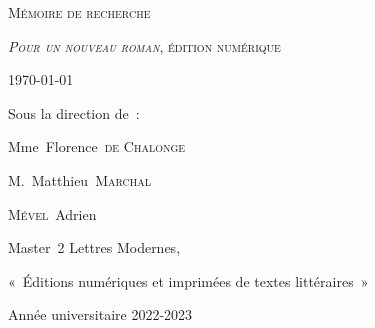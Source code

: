 \documentclass[12pt, a4paper]{article}
\begin{document}


\begin{titlepage}
  

\vspace*{3cm}

 
\begin{center}
\textsc{\huge Mémoire de recherche}

\textsc{\textit{Pour un nouveau roman}, édition numérique}



\today


\vspace*{2cm}
Sous la direction de~: 

Mme~Florence~\textsc{de Chalonge}


M.~Matthieu~\textsc{Marchal}




\vspace*{11cm}
\small
\textsc{Mével}~Adrien

Master~2 Lettres Modernes,

«~Éditions numériques et imprimées de textes littéraires~»

\vspace*{2.5cm}
Année universitaire 2022-2023




\end{center}


\end{titlepage}	

\newcommand{\qql}{\textsc{Sartre} Jean-Paul, \textit{Qu'est-ce que la littérature}, Paris, Gallimard, coll. «~folio essais~», 2008 [1948], p.~}
\newcommand{\punr}{\textit{Pour un nouveau roman}}
\newcommand{\robbe}{Alain~Robbe-Grillet}
\newcommand{\galia}{Galia~\textsc{Yanoshevsky}}
\newcommand{\op}{\textit{Op. cit.}, p.~}
\newcommand{\fullgalia}{\textsc{Yanoshevsky} Galia, \textit{Les discours du Nouveau Roman~: Essais, entretiens, débats}, Villeneuve d'Ascq, Presses universitaires du Septentrion, 2006, p.~}
\newcommand{\gege}{\textsc{Genette}~Gérard, «~Vertige fixé~», \textit{Figures I}, Paris, Éditions du seuil, coll.~«~points essai~», 2014[1966], p.~}
\newcommand{\inte}{\footnote{\textsc{Boschetti}~Anna, \textsc{Sapiro}~Gisèle (dir.~), «~La recomposition de l'espace intellectuel en Europe après 1945~», Paris, La Découverte, \textit{L'Espace intellectuel en Europe}, 2009, p.~147-182

En ligne~: \href{https://doi.org/10.3917/dec.sapir.2009.01.0147}{https://doi.org/10.3917/dec.sapir.2009.01.0147}}}
\newcommand{\riri}{\textsc{Ricardou}~Jean, \textit{Le Nouveau Roman suivi de Les Raisons de l'ensemble}, Paris, Éditions du Seuil, coll.~«~Points~», 1990 [1973]}
\newcommand{\mila}{\textsc{Milat}~Christian, «~Sartre et Robbe-Grillet, ou les chemins de l'écriture~», Paris, \textit{Revue d'Histoire littéraire de la France}, Janvier-Février, 2002, p.~}
\vspace*{3cm}
\end{document}
